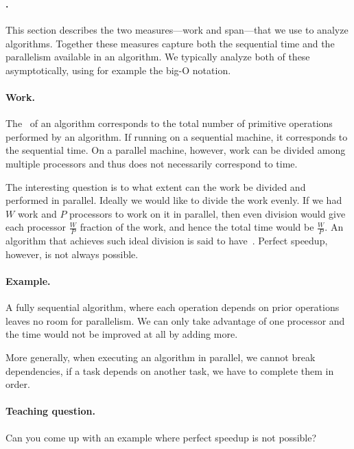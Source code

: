 \subsubsection{}

\paragraph{.}
This section describes the two measures---work and span---that we use
to analyze algorithms.  Together these measures capture both the
sequential time and the parallelism available in an algorithm.
%
We typically analyze both of these asymptotically, using
for example the big-O notation.
%


\paragraph{Work.}
The~ of an algorithm corresponds to the total number of
primitive operations performed by an algorithm.  If running on a
sequential machine, it corresponds to the sequential time.
%
On a parallel machine, however, work can be divided among multiple
processors and thus does not necessarily correspond to time.
%

The interesting question is to what extent can the work be divided and
performed in parallel.  Ideally we would like to divide the work
evenly.  If we had $W$ work and $P$ processors to work on it in
parallel, then even division would give each processor $\frac{W}{P}$
fraction of the work, and hence the total time would be $\frac{W}{P}$.
%
An algorithm that achieves such ideal division is said to
have~.  Perfect speedup, however, is not always
possible.
%

\paragraph{Example.}
A fully sequential algorithm, where each operation depends on prior
operations leaves no room for parallelism.
%
We can only take advantage of one processor and the time would not be
improved at all by adding more.  
%

More generally, when executing an algorithm in parallel, we cannot
break dependencies, if a task depends on another task, we have to
complete them in order.

\paragraph{Teaching question.}
Can you come up with an example where perfect speedup is not possible?

